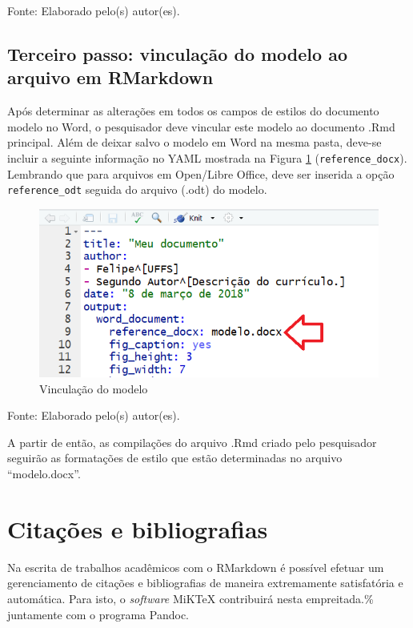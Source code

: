 \documentclass[12pt,brazil,oneside]{book}
\begin{document}
Fonte: Elaborado pelo(s) autor(es).

\hypertarget{terceiro-passo-vinculacao-do-modelo-ao-arquivo-em-rmarkdown}{%
\subsection{Terceiro passo: vinculação do modelo ao arquivo em RMarkdown}\label{terceiro-passo-vinculacao-do-modelo-ao-arquivo-em-rmarkdown}}

Após determinar as alterações em todos os campos de estilos do documento modelo no Word, o pesquisador deve vincular este modelo ao documento .Rmd principal. Além de deixar salvo o modelo em Word na mesma pasta, deve-se incluir a seguinte informação no YAML mostrada na Figura \ref{fig:rmarkestilos2} (\texttt{reference\_docx}). Lembrando que para arquivos em Open/Libre Office, deve ser inserida a opção \texttt{reference\_odt} seguida do arquivo (.odt) do modelo.

\begin{figure}[H]

{\centering \includegraphics[width=0.8\linewidth]{rmarkestilos2} 

}

\caption{Vinculação do modelo}\label{fig:rmarkestilos2}
\end{figure}

Fonte: Elaborado pelo(s) autor(es).

A partir de então, as compilações do arquivo .Rmd criado pelo pesquisador seguirão as formatações de estilo que estão determinadas no arquivo ``modelo.docx''.

\hypertarget{citacoes-e-bibliografias}{%
\section{Citações e bibliografias}\label{citacoes-e-bibliografias}}

Na escrita de trabalhos acadêmicos com o RMarkdown é possível efetuar um gerenciamento de citações e bibliografias de maneira extremamente satisfatória e automática. Para isto, o \emph{software} MiKTeX contribuirá nesta empreitada.\% juntamente com o programa Pandoc.
\end{document}
